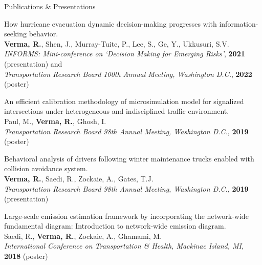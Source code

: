 \documentclass{CV} %
\begin{document}
\begin{rSection}{Publications \& Presentations}
\begin{etaremune}
        \item How hurricane evacuation dynamic decision-making progresses with information-seeking behavior.
        \\ \textbf{Verma, R.}, Shen, J., Murray-Tuite, P., Lee, S., Ge, Y., Ukkusuri, S.V.
        \\ \textit{INFORMS: Mini-conference on `Decision Making for Emerging Risks'}, \textbf{2021} (presentation) and
        \\ \textit{Transportation Research Board 100th Annual Meeting, Washington D.C.}, \textbf{2022} (poster)
    
        \item An efficient calibration methodology of microsimulation model for signalized intersections under heterogeneous and indisciplined traffic environment.
        \\ Paul, M., \textbf{Verma, R.}, Ghosh, I.
        \\ \textit{Transportation Research Board 98th Annual Meeting, Washington D.C.}, \textbf{2019} (poster)
        
        \item Behavioral analysis of drivers following winter maintenance trucks enabled with collision avoidance system.
        \\ \textbf{Verma, R.}, Saedi, R., Zockaie, A., Gates, T.J.
        \\ \textit{Transportation Research Board 98th Annual Meeting, Washington D.C.}, \textbf{2019} (presentation)

        \item Large-scale emission estimation framework by incorporating the network-wide fundamental diagram: Introduction to network-wide emission diagram.
        \\ Saedi, R., \textbf{Verma, R.}, Zockaie, A., Ghamami, M.
        \\ \textit{International Conference on Transportation \& Health, Mackinac Island, MI}, \textbf{2018} (poster)
    \end{etaremune}
\end{rSection}
\end{document}
